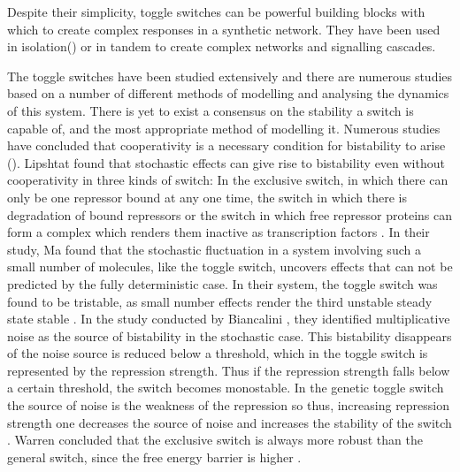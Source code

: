 Despite their simplicity, toggle switches can be powerful building blocks with which to create complex responses in a synthetic network. They have been used in isolation() or in tandem to create complex networks and signalling cascades. 

The toggle switches have been studied extensively and there are numerous studies based on a number of different methods of modelling and analysing the dynamics of this system. There is yet to exist a consensus on the stability a switch is capable of, and the most appropriate method of modelling it. Numerous studies have concluded that cooperativity is a necessary condition for bistability to arise (). Lipshtat \autocite{Lipshtat:2006wb} found that stochastic effects can give rise to bistability even without cooperativity in three kinds of switch: In the exclusive switch, in which there can only be one repressor bound at any one time, the switch in which there is degradation of bound repressors or the switch in which free repressor proteins can form a complex which renders them inactive as transcription factors \autocite{Lipshtat:2006wb}. In their study, Ma found that the stochastic fluctuation in a system involving such a small number of molecules, like the toggle switch, uncovers effects that can not be predicted by the fully deterministic case. In their system, the toggle switch was found to be tristable, as small number effects render the third unstable steady state stable \autocite{Ma:2012dt}. In the study conducted by Biancalini \autocite{Biancalani:2015vy}, they identified multiplicative noise as the source of bistability in the stochastic case. This bistability disappears of the noise source is reduced below a threshold, which in the toggle switch is represented by the repression strength. Thus if the repression strength falls below a certain threshold, the switch becomes monostable. In the genetic toggle switch the source of noise is the weakness of the repression so thus, increasing repression strength one decreases the source of noise and increases the stability of the switch \autocite{Warren:2005kea}. Warren concluded that the exclusive switch is always more robust than the general switch, since the free energy barrier is higher \autocite{Warren:2005kea}.


